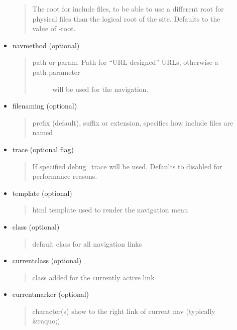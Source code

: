 \documentclass[letterpaper,10pt,english]{sphinxmanual}
\begin{document}
\begin{fulllineitems}
\begin{fulllineitems}
\begin{description}
\begin{itemize}
\begin{quote}
The root for include files, to be able to use a different root for physical
files than the logical root of the site. Defaults to the value of -root.
\end{quote}

\item {} 
navmethod (optional)
\begin{quote}
\begin{description}
\item[{path or param. Path for ``URL designed'' URLs, otherwise a -path parameter}] \leavevmode
will be used for the navigation.

\end{description}
\end{quote}

\item {} 
filenaming (optional)
\begin{quote}

prefix (default), suffix or extension, specifies how include files are named
\end{quote}

\item {} 
trace (optional flag)
\begin{quote}

If specified debug\_trace will be used. Defaults to disabled for performance reasons.
\end{quote}

\item {} 
template (optional)
\begin{quote}

html template used to render the navigation menu
\end{quote}

\item {} 
class (optional)
\begin{quote}

default class for all navigation links
\end{quote}

\item {} 
currentclass (optional)
\begin{quote}

class added for the currently active link
\end{quote}

\item {} 
currentmarker (optional)
\begin{quote}

character(s) show to the right link of current nav (typically \&raquo;)
\end{quote}


\end{itemize}
\end{description}
\end{fulllineitems}
\end{fulllineitems}
\end{document}
